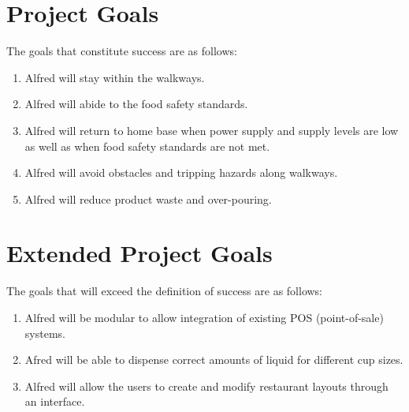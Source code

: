 \documentclass [10pt]{article}
\begin{document}

\section{Project Goals}
The goals that constitute success are as follows: \\

\begin{enumerate}[label=G\arabic*:, ref =\arabic*, leftmargin=0.5in]
	
	\item Alfred will stay within the walkways.
	\item Alfred will abide to the food safety standards. 
	\item Alfred will return to home base when power supply and supply levels are low as well as when food safety standards are not met.
	\item Alfred will avoid obstacles and tripping hazards along walkways.
	\item Alfred will reduce product waste and over-pouring.	
	
\end{enumerate}


\section{Extended Project Goals}
The goals that will exceed the definition of success are as follows: \\

\begin{enumerate}[label=E\arabic*:, ref =\arabic*, leftmargin=0.5in]	

	\item Alfred will be modular to allow integration of existing POS (point-of-sale) systems.
	\item Afred will be able to dispense correct amounts of liquid for different cup sizes.
	\item Alfred will allow the users to create and modify restaurant layouts through an interface.

\end{enumerate}
\end{document}

